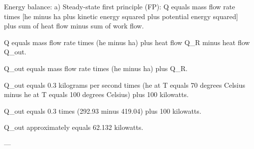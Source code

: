 Energy balance:  
a) Steady-state first principle (FP):  
Q equals mass flow rate times [he minus ha plus kinetic energy squared plus potential energy squared] plus sum of heat flow minus sum of work flow.  

Q equals mass flow rate times (he minus ha) plus heat flow Q_R minus heat flow Q_out.  

Q_out equals mass flow rate times (he minus ha) plus Q_R.  

Q_out equals 0.3 kilograms per second times (he at T equals 70 degrees Celsius minus he at T equals 100 degrees Celsius) plus 100 kilowatts.  

Q_out equals 0.3 times (292.93 minus 419.04) plus 100 kilowatts.  

Q_out approximately equals 62.132 kilowatts.  

---